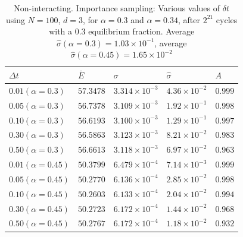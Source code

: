 \documentclass[%
oneside,                 %
final,                   %
10pt]{article}
\begin{document}
\begin{table}[h!]
\begin{center}
\begin{tabular}{lllll}
\hline
 $\Delta t$ & $\bar E$ & $\sigma$ & $\hat \sigma$ & $A$     \\
\hline
$0.01 (\alpha=0.3) $  &	$57.3478$	& 	$3.314 \times 10^{-3}$  & $4.36 \times 10^{-2}$ & $0.999$  \\  
$0.05 (\alpha=0.3) $  &	$56.7378$	&	$3.109 \times 10^{-3}$  & $1.92 \times 10^{-1}$ & $0.998$  \\  
$0.10 (\alpha=0.3) $  &	$56.6193$	& 	$3.100 \times 10^{-3}$  & $1.29 \times 10^{-1}$ & $0.997$  \\ 
$0.30 (\alpha=0.3) $  & $56.5863$	&	$3.123 \times 10^{-3}$  & $8.21 \times 10^{-2}$ & $0.983$  \\ 
$0.50 (\alpha=0.3) $  &	$56.6613$	&	$3.118 \times 10^{-3}$  & $6.97 \times 10^{-2}$ & $0.963$  \\ 
$0.01 (\alpha=0.45) $ & $50.3799$	& 	$6.479 \times 10^{-4}$  & $7.14 \times 10^{-3}$ & $0.999$  \\ 
$0.05 (\alpha=0.45) $ & $50.2770$	&	$6.136 \times 10^{-4}$  & $2.85 \times 10^{-2}$ & $0.998$  \\  
$0.10 (\alpha=0.45) $ & $50.2603$	& 	$6.133 \times 10^{-4}$  & $2.04 \times 10^{-2}$ & $0.994$  \\  
$0.30 (\alpha=0.45) $ & $50.2723$ 	&	$6.172 \times 10^{-4}$  & $1.44 \times 10^{-2}$ & $0.968$  \\ 
$0.50 (\alpha=0.45) $ & $50.2767$	&	$6.172 \times 10^{-4}$  & $1.18 \times 10^{-2}$ & $0.932$  \\ 
\hline
\end{tabular}
\end{center}
\caption{Non-interacting. Importance sampling: Various values of $\delta t$ using $N=100$, $d=3$, for $\alpha=0.3$ and $\alpha=0.34$, after $2^{21}$ cycles with a $0.3$ equilibrium fraction. Average $\hat \sigma(\alpha=0.3)=1.03 \times 10^{-1}$, average $\hat \sigma(\alpha=0.45)=1.65 \times 10^{-2}$}
\label{table:importance_sampling_deltas2}
\end{table}
\end{document}
